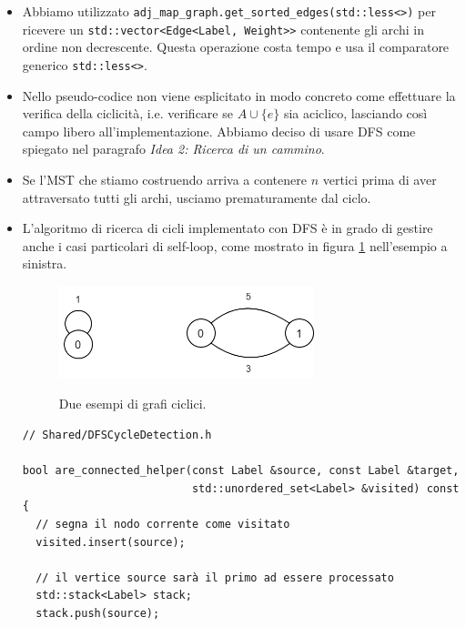 \begin{itemize}
    \item Abbiamo utilizzato \texttt{adj_map_graph.get_sorted_edges(std::less<>{})} per ricevere un \texttt{std::vector<Edge<Label, Weight>>} contenente gli archi in ordine non decrescente. Questa operazione costa tempo \complexityMLogM{} e usa il comparatore generico \texttt{std::less<>}.\\

    \item Nello pseudo-codice non viene esplicitato in modo concreto come effettuare la verifica della ciclicità, i.e. verificare se $A \cup \{ e \}$ sia aciclico, lasciando così campo libero all'implementazione. Abbiamo deciso di usare DFS come spiegato nel paragrafo \textit{Idea 2: Ricerca di un cammino}. \\

    \item Se l'MST che stiamo costruendo arriva a contenere $n$ vertici prima di aver attraversato tutti gli archi, usciamo prematuramente dal ciclo.\\

    \item L'algoritmo di ricerca di cicli implementato con DFS è in grado di gestire anche i casi particolari di self-loop, come mostrato in figura \ref{fig:SelfLoop} nell'esempio a sinistra.

\begin{figure}[h]
	\caption{Due esempi di grafi ciclici.}
	\centering
	\includegraphics[width=0.7\textwidth]{./images/ExampleSelfLoop.png}
	\label{fig:SelfLoop}
\end{figure}

\begin{listing}[!ht]
\begin{verbatim}
// Shared/DFSCycleDetection.h

bool are_connected_helper(const Label &source, const Label &target,
                          std::unordered_set<Label> &visited) const {
  // segna il nodo corrente come visitato
  visited.insert(source);

  // il vertice source sarà il primo ad essere processato
  std::stack<Label> stack;
  stack.push(source);


\end{verbatim}
\end{listing}
\end{itemize}
